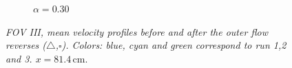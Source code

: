 \documentclass[review, authoryear]{elsarticle}
\newcommand{\cm}{\,\mbox{cm}}
\begin{document}
\begin{figure}[]
{\begin{subfigure}[b]{.3\textwidth}
\caption{$\alpha=0.30$}
\end{subfigure}%
}
\caption{ \textit{FOV III, mean velocity profiles before and after the outer flow reverses ($\triangle$,$\square$). Colors: blue, cyan and green correspond to run 1,2 and 3. 
$x=81.4\cm$}. }
\label{fig:PIV_FOV5}
\end{figure}
\end{document}

